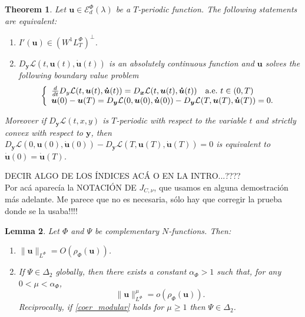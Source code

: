 \documentclass[twoside]{article}
\newtheorem{thm}{Theorem}[section]
\newtheorem{lem}[thm]{Lemma}
\theoremstyle{remark}
\newcommand{\orlnor}{\|_{L^{\Phi}}}
\newcommand{\lphi}{L^{\Phi}}
\newcommand{\wphi}{W^{1}\lphi}
\newcommand{\domi}{\mathcal{E}^{\Phi}_d(\lambda)}
\renewcommand{\b}[1]{\boldsymbol{#1}}
\begin{document}
\begin{thm}\label{critpoint} Let $\b{u}\in\domi$ be  a $T$-periodic function. The following statements are equivalent:
\begin{enumerate}
 \item $I'(\b{u})\in\left( \wphi_T\right)^{\perp}$.
 \item  $D_{\b{y}}\mathcal{L}(t,\b{u}(t),\b{\dot{u}}(t))$ is an absolutely continuous function and $\b{u}$ solves the following boundary value problem
 \begin{equation}\label{ecualagran2}
    \left\{%
\begin{array}{ll}
   \frac{d}{dt} D_{y}\mathcal{L}(t,\b{u}(t),\b{\dot{u}}(t))= D_{\b{x}}\mathcal{L}(t,\b{u}(t),\b{\dot{u}}(t)) \quad \hbox{a.e.}\ t \in (0,T)\\
    \b{u}(0)-\b{u}(T)=D_{\b{y}}\mathcal{L}(0,\b{u}(0),\b{\dot{u}}(0))-D_{\b{y}}\mathcal{L}(T,\b{u}(T),\b{\dot{u}}(T))=0.
\end{array}%
\right.
\end{equation}
\end{enumerate}
Moreover if $D_{\b{y}}\mathcal{L}(t,x,y)$ is $T$-periodic with respect to the variable $t$ and strictly convex with respect to $\b{y}$, then
$D_{\b{y}}\mathcal{L}(0,\b{u}(0),\b{\b{\dot{\b{u}}}}(0))-D_{\b{y}}\mathcal{L}(T,\b{u}(T),\b{\dot{u}}(T))=0$ is equivalent to $\b{\dot{u}}(0)=\b{\dot{u}}(T)$.
\end{thm}





DECIR ALGO DE LOS \'INDICES AC\'A O EN LA INTRO...????
\\
Por ac\'a aparec\'ia la NOTACI\'ON DE $J_{C,\nu}$, que usamos en alguna demostraci\'on m\'as adelante.
Me parece que no es necesaria, s\'olo hay que corregir la prueba donde se la usaba!!!! 



\begin{lem}\label{lem_coer} Let $\Phi$ and $\Psi$ be complementary $N$-functions. Then:
\begin{enumerate}
  \item $\|\b{u}\orlnor=O\left( \rho_{\Phi}\left(\b{u} \right)  \right)$.
  
  \item If $\Psi \in \Delta_2$ globally, then there exists a constant $\alpha_{\Phi}>1$ such that, for any $0<\mu<\alpha_{\Phi}$,
\begin{equation}\label{coer_modular} \|\b{u}\orlnor^{\mu} =o\left(\rho_{\Phi}\left(\b{u}\right)\right).
\end{equation}
Reciprocally, if \eqref{coer_modular} holds for $\mu\geq 1$ then $\Psi \in \Delta_2$.  
\end{enumerate}
\end{lem}
\end{document}
